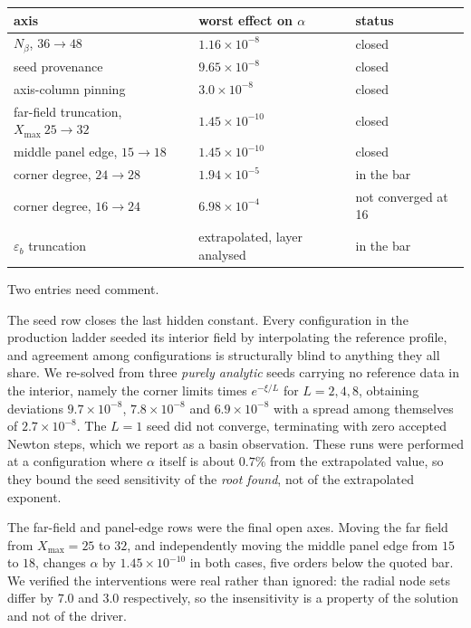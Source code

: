 \documentclass[11pt]{article}
\newcommand{\Xmax}{X_{\max}}
\begin{document}
\begin{center}
\begin{tabular}{lll}
\toprule
axis & worst effect on $\alpha$ & status \\
\midrule
$N_\beta$, $36 \to 48$ & $1.16\times10^{-8}$ & closed \\
seed provenance & $9.65\times10^{-8}$ & closed \\
axis-column pinning & $3.0\times10^{-8}$ & closed \\
far-field truncation, $\Xmax\ 25 \to 32$ & $1.45\times10^{-10}$ & closed \\
middle panel edge, $15 \to 18$ & $1.45\times10^{-10}$ & closed \\
corner degree, $24 \to 28$ & $1.94\times10^{-5}$ & in the bar \\
corner degree, $16 \to 24$ & $6.98\times10^{-4}$ & not converged at 16 \\
$\varepsilon_b$ truncation & extrapolated, layer analysed & in the bar \\
\bottomrule
\end{tabular}
\end{center}

Two entries need comment.

The seed row closes the last hidden constant. Every configuration in the production
ladder seeded its interior field by interpolating the reference profile, and agreement
among configurations is structurally blind to anything they all share. We re-solved from
three \emph{purely analytic} seeds carrying no reference data in the interior, namely the
corner limits times $e^{-\xi/L}$ for $L = 2, 4, 8$, obtaining deviations
$9.7\times10^{-8}$, $7.8\times10^{-8}$ and $6.9\times10^{-8}$ with a spread among
themselves of $2.7\times10^{-8}$. The $L = 1$ seed did not converge, terminating with
zero accepted Newton steps, which we report as a basin observation. These runs were
performed at a configuration where $\alpha$ itself is about $0.7\%$ from the extrapolated
value, so they bound the seed sensitivity of the \emph{root found}, not of the
extrapolated exponent.

The far-field and panel-edge rows were the final open axes. Moving the far field from
$\Xmax = 25$ to $32$, and independently moving the middle panel edge from $15$ to $18$,
changes $\alpha$ by $1.45\times10^{-10}$ in both cases, five orders below the quoted bar.
We verified the interventions were real rather than ignored: the radial node sets differ
by $7.0$ and $3.0$ respectively, so the insensitivity is a property of the solution and
not of the driver.
\end{document}

